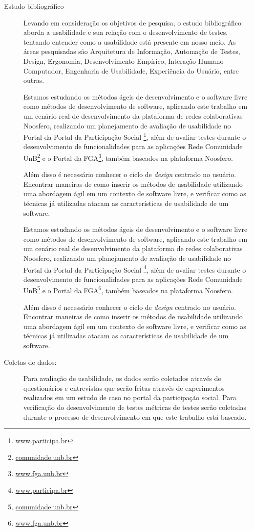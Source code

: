 \begin{description}
\item[Estudo bibliográfico]

Levando em consideração os objetivos de pesquisa, o estudo bibliográfico  aborda a usabilidade e sua relação com o desenvolvimento de testes, tentando entender como a usabilidade está presente em nosso meio. As áreas pesquisadas são Arquitetura de Informação, Automação de Testes, Design, Ergonomia, Desenvolvimento Empírico, Interação Humano Computador, Engenharia de Usabilidade, Experiência do Usuário, entre outras.

%
Estamos estudando os métodos ágeis de desenvolvimento e o software livre como métodos de desenvolvimento de software, aplicando este trabalho em um cenário real de desenvolvimento da plataforma de redes colaborativas Noosfero, realizando um planejamento de avaliação de usabilidade no Portal da Portal da Participação Social \footnote{\url{www.participa.br}}, além de avaliar testes durante o desenvolvimento de funcionalidades para as aplicações Rede Comunidade UnB\footnote{\url{comunidade.unb.br}} e o Portal da FGA\footnote{\url{www.fga.unb.br}}, também baseados na plataforma Noosfero.


%
Além disso é necessário conhecer o ciclo de \emph{design} centrado no usuário. Encontrar maneiras de como inserir os métodos de usabilidade utilizando uma abordagem ágil em um contexto de software livre, e verificar como as técnicas já utilizadas atacam as características de usabilidade de um software.
%

Estamos estudando os métodos ágeis de desenvolvimento e o software livre como métodos de desenvolvimento de software, aplicando este trabalho em um cenário real de desenvolvimento da plataforma de redes colaborativas Noosfero, realizando um planejamento de avaliação de usabilidade no Portal da Portal da Participação Social \footnote{\url{www.participa.br}}, além de avaliar testes durante o desenvolvimento de funcionalidades para as aplicações Rede Comunidade UnB\footnote{\url{comunidade.unb.br}} e o Portal da FGA\footnote{\url{www.fga.unb.br}}, também baseados na plataforma Noosfero.

%
Além disso é necessário conhecer o ciclo de \emph{design} centrado no usuário. Encontrar maneiras de como inserir os métodos de usabilidade utilizando uma abordagem ágil em um contexto de software livre, e verificar como as técnicas já utilizadas atacam as características de usabilidade de um software.


\item[Coletas de dados:]
%

Para avaliação de usabilidade, os dados serão coletados através de questionários e entrevistas que serão feitas através de experimentos realizados em um estudo de caso no portal da participação social.
Para verificação do desenvolvimento de testes métricas de testes serão coletadas durante o processo de desenvolvimento em que este trabalho está baseado.

\end{description}

